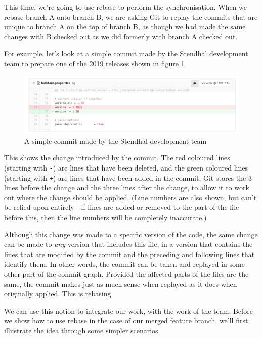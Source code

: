 \documentclass[
]{book}
\begin{document}
This time, we're going to use rebase to perform the synchronisation. When we rebase branch A onto branch B, we are asking Git to replay the commits that are unique to branch A on the top of branch B, as though we had made the same changes with B checked out as we did formerly with branch A checked out.

For example, let's look at a simple commit made by the Stendhal development team to prepare one of the 2019 releases shown in figure \ref{fig:sampleGitLabCommitView-fig}

\begin{figure}

{\centering \includegraphics[width=1\linewidth]{images/sampleGitLabCommitView} 

}

\caption{A simple commit made by the Stendhal development team}\label{fig:sampleGitLabCommitView-fig}
\end{figure}

This shows the change introduced by the commit. The red coloured lines (starting with \texttt{-}) are lines that have been deleted, and the green coloured lines (starting with \texttt{+}) are lines that have been added in the commit. Git stores the 3 lines before the change and the three lines after the change, to allow it to work out where the change should be applied. (Line numbers are also shown, but can't be relied upon entirely - if lines are added or removed to the part of the file before this, then the line numbers will be completely inaccurate.)

Although this change was made to a specific version of the code, the same change can be made to \emph{any} version that includes this file, in a version that contains the lines that are modified by the commit and the preceding and following lines that identify them. In other words, the commit can be taken and replayed in some other part of the commit graph. Provided the affected parts of the files are the same, the commit makes just as much sense when replayed as it does when originally applied. This is rebasing.

We can use this notion to integrate our work, with the work of the team.
Before we show how to use rebase in the case of our merged feature branch, we'll first illustrate the idea through some simpler scenarios.
\end{document}
